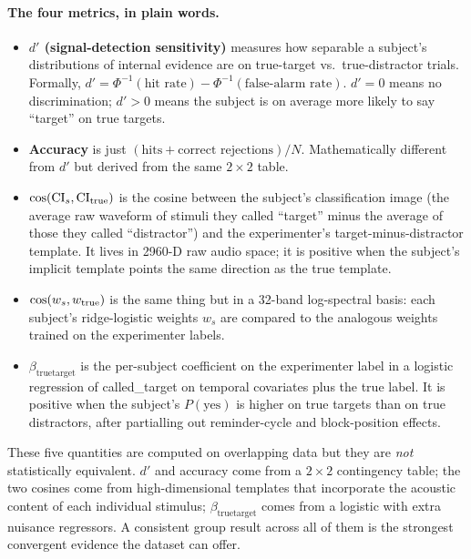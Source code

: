 \documentclass[11pt]{article}
\begin{document}
\paragraph{The four metrics, in plain words.}
\begin{itemize}
\item \textbf{$d'$ (signal-detection sensitivity)} measures how
      separable a subject's distributions of internal evidence are on
      true-target vs.\ true-distractor trials.  Formally, $d' =
      \Phi^{-1}(\text{hit rate}) - \Phi^{-1}(\text{false-alarm rate})$.
      $d'=0$ means no discrimination; $d'>0$ means the subject is on
      average more likely to say ``target'' on true targets.
\item \textbf{Accuracy} is just $(\text{hits} + \text{correct
      rejections})/N$.  Mathematically different from $d'$ but
      derived from the same $2\times 2$ table.
\item \textbf{$\cos(\mathrm{CI}_s, \mathrm{CI}_{\rm true})$} is the
      cosine between the subject's classification image (the average
      raw waveform of stimuli they called ``target'' minus the average
      of those they called ``distractor'') and the experimenter's
      target-minus-distractor template.  It lives in 2960-D raw audio
      space; it is positive when the subject's implicit template
      points the same direction as the true template.
\item \textbf{$\cos(w_s, w_{\rm true})$} is the same thing but in a
      32-band log-spectral basis: each subject's ridge-logistic
      weights $w_s$ are compared to the analogous weights trained on
      the experimenter labels.
\item \textbf{$\beta_{\text{truetarget}}$} is the per-subject
      coefficient on the experimenter label in a logistic regression
      of called\_target on temporal covariates plus the true label.
      It is positive when the subject's $P(\text{yes})$ is higher on
      true targets than on true distractors, after partialling out
      reminder-cycle and block-position effects.
\end{itemize}
These five quantities are computed on overlapping data but they are
\emph{not} statistically equivalent.  $d'$ and accuracy come from a
$2\times 2$ contingency table; the two cosines come from
high-dimensional templates that incorporate the acoustic content of
each individual stimulus; $\beta_{\text{truetarget}}$ comes from a
logistic with extra nuisance regressors.  A consistent group result
across all of them is the strongest convergent evidence the dataset
can offer.
\end{document}
